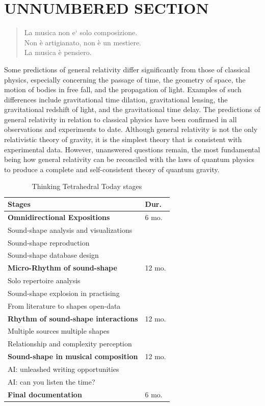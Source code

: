 \section*{UNNUMBERED SECTION}

\begin{quote}
La musica non e` solo composizione. \\
Non è artigianato, non è un mestiere. \\
La musica è pensiero. \cite{nono85}
\end{quote}

Some predictions of general relativity differ significantly from those of
classical physics, especially concerning the passage of time, the geometry of
space, the motion of bodies in free fall, and the propagation of light. Examples
of such differences include gravitational time dilation, gravitational lensing,
the gravitational redshift of light, and the gravitational time delay. The
predictions of general relativity in relation to classical physics have been
confirmed in all observations and experiments to date. Although general
relativity is not the only relativistic theory of gravity, it is the simplest
theory that is consistent with experimental data. However, unanswered questions
remain, the most fundamental being how general relativity can be reconciled with
the laws of quantum physics to produce a complete and self-consistent theory of
quantum gravity.

\begin{table}[htp]
\begin{center}
\begin{tabular}{ll}
\textbf{Stages} & \textbf{Dur.} \\
\hline
\textbf{Omnidirectional Expositions} & 6 mo. \\
Sound-shape analysis and visualizations & \\
Sound-shape reproduction & \\
Sound-shape database design & \\
\hline
\textbf{Micro-Rhythm of sound-shape} & 12 mo. \\
Solo repertoire analysis & \\
Sound-shape explosion in practising & \\
From literature to shapes open-data & \\
\hline
\textbf{Rhythm of sound-shape interactions} & 12 mo. \\
Multiple sources multiple shapes & \\
Relationship and complexity perception & \\
\hline
\textbf{Sound-shape in musical composition} & 12 mo. \\
AI: unleashed writing opportunities & \\
AI: can you listen the time? & \\
\hline
\textbf{Final documentation} & 6 mo. \\
\end{tabular}
\label{timesheet}
\caption{Thinking Tetrahedral Today stages}
\end{center}
\end{table}%

